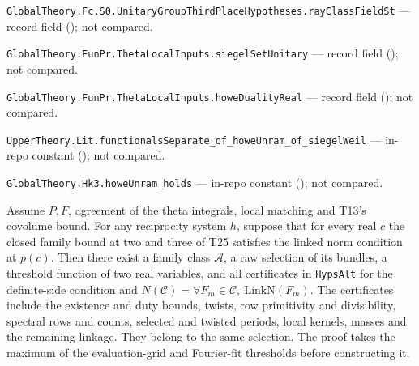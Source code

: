 \noindent\nolinkurl{GlobalTheory.Fc.S0.UnitaryGroupThirdPlaceHypotheses.rayClassFieldSt} --- record field (); not compared.\par
\noindent\nolinkurl{GlobalTheory.FunPr.ThetaLocalInputs.siegelSetUnitary} --- record field (); not compared.\par
\noindent\nolinkurl{GlobalTheory.FunPr.ThetaLocalInputs.howeDualityReal} --- record field (); not compared.\par
\noindent\nolinkurl{UpperTheory.Lit.functionalsSeparate_of_howeUnram_of_siegelWeil} --- in-repo constant (); not compared.\par
\noindent\nolinkurl{GlobalTheory.Hk3.howeUnram_holds} --- in-repo constant (); not compared.\par

\begin{formalstatement}\label{sub:T02}

Assume $P,F$, agreement of the theta integrals, local matching and T13's
covolume bound. For any reciprocity system $h$, suppose that for every real $c$
the closed family bound at two and three of T25 satisfies the linked norm
condition at $p(c)$. Then there exist a family class $\mathcal A$, a raw selection
of its bundles, a threshold function of two real variables, and all certificates
in \nolinkurl{HypsAlt} for the definite-side condition and $N(\mathcal C)
=\forall F_m\in\mathcal C,\ \mathrm{LinkN}(F_m)$.
The certificates include the existence and duty bounds, twists, row
primitivity and divisibility, spectral rows and counts, selected and twisted
periods, local kernels, masses and the remaining linkage. They belong to the
same selection. The proof takes the maximum of the evaluation-grid and
Fourier-fit thresholds before constructing it.

\end{formalstatement}
